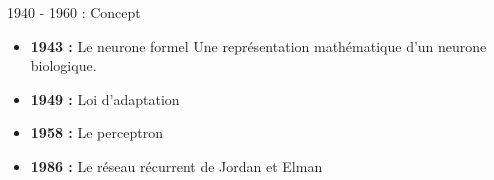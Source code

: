 \begin{frame}{1940 - 1960 : Concept}
	\begin{itemize}
		\item \textbf{1943 :} Le neurone formel \cite{McCulloch43}
		\newline Une représentation mathématique d’un neurone biologique.
		\item \textbf{1949 :} Loi d'adaptation \cite{Hebb49}
		\item \textbf{1958 :} Le perceptron \cite{Rosenblatt58}
		\item \textbf{1986 :} Le réseau récurrent de Jordan et Elman \cite{Jordan86}
	\end{itemize}
\end{frame}

